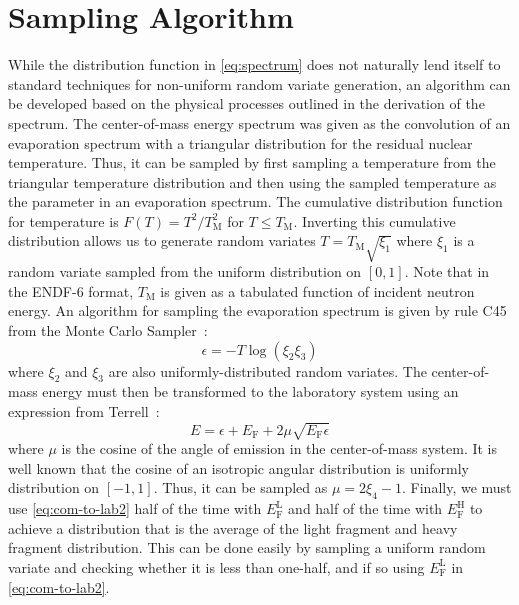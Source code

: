 \documentclass[3p,fleqn]{elsarticle}
\newcommand{\tmax}{T_{\mathrm{M}}}
\newcommand{\ef}{E_{\mathrm{F}}}
\newcommand{\efl}{E_{\mathrm{F}}^{\mathrm{L}}}
\newcommand{\efh}{E_{\mathrm{F}}^{\mathrm{H}}}
\begin{document}
\section{Sampling Algorithm}

While the distribution function in \autoref{eq:spectrum} does not naturally lend
itself to standard techniques for non-uniform random variate generation, an
algorithm can be developed based on the physical processes outlined in the
derivation of the spectrum. The center-of-mass energy spectrum was given as the
convolution of an evaporation spectrum with a triangular distribution for the
residual nuclear temperature. Thus, it can be sampled by first sampling a
temperature from the triangular temperature distribution and then using the
sampled temperature as the parameter in an evaporation spectrum. The cumulative
distribution function for temperature is $F(T) = T^2/\tmax^2$ for $T \le
\tmax$. Inverting this cumulative distribution allows us to generate random
variates $T = \tmax \sqrt{\xi_1}$ where $\xi_1$ is a random variate sampled from
the uniform distribution on $[0,1]$. Note that in the ENDF-6 format, $\tmax$ is
given as a tabulated function of incident neutron energy. An algorithm for
sampling the evaporation spectrum is given by rule C45 from the Monte Carlo
Sampler~\cite{lanl-everett-1983}:
\begin{equation*}
  \epsilon = -T \log (\xi_2 \xi_3)
\end{equation*}
where $\xi_2$ and $\xi_3$ are also uniformly-distributed random variates. The
center-of-mass energy must then be transformed to the laboratory system using an
expression from Terrell~\cite{physrev-terrell-1959}:
\begin{equation}
  E = \epsilon + \ef + 2\mu \sqrt{\ef \epsilon}
  \label{eq:com-to-lab2}
\end{equation}
where $\mu$ is the cosine of the angle of emission in the center-of-mass
system. It is well known that the cosine of an isotropic angular distribution is
uniformly distribution on $[-1,1]$. Thus, it can be sampled as $\mu = 2\xi_4 -
1$. Finally, we must use \autoref{eq:com-to-lab2} half of the time with $\efl$ and
half of the time with $\efh$ to achieve a distribution that is the average of
the light fragment and heavy fragment distribution. This can be done easily by
sampling a uniform random variate and checking whether it is less than one-half,
and if so using $\efl$ in \autoref{eq:com-to-lab2}.
\end{document}
